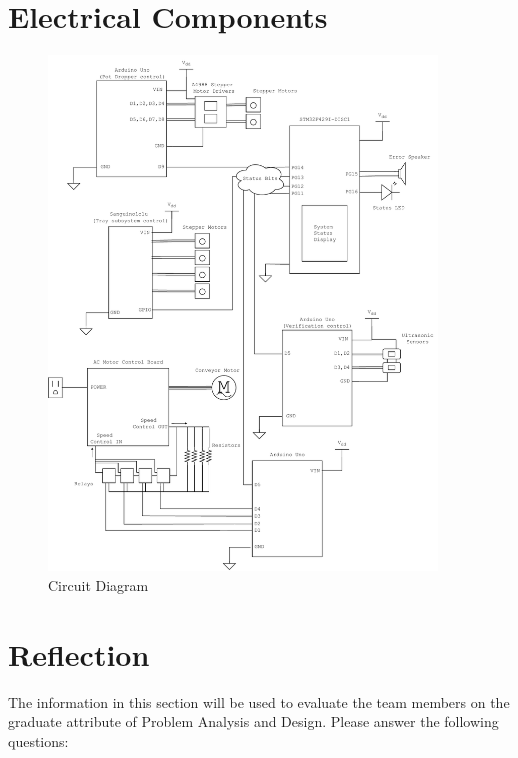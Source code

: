 \documentclass[12pt, titlepage]{article}
\begin{document}
\section{Electrical Components}

\begin{figure}[H]
  \centering
  \includegraphics[width=0.92\textwidth]{circuit_diagram.pdf}
  \caption{Circuit Diagram}
  \label{fig:circuit}
\end{figure}

\section{Reflection}

The information in this section will be used to evaluate the team members on the
graduate attribute of Problem Analysis and Design.  Please answer the following questions:
\end{document}
